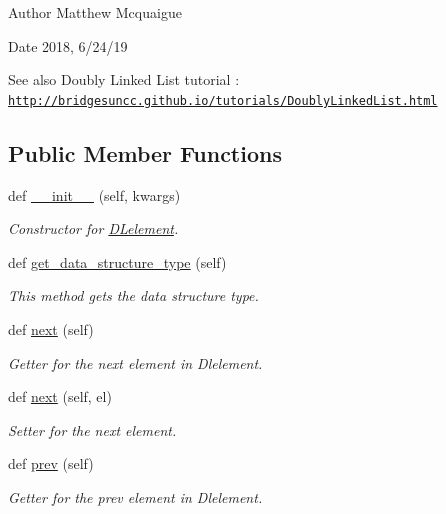 \begin{DoxyAuthor}{Author}
Matthew Mcquaigue 
\end{DoxyAuthor}
\begin{DoxyDate}{Date}
2018, 6/24/19
\end{DoxyDate}
\begin{DoxySeeAlso}{See also}
Doubly Linked List tutorial \+: \href{http://bridgesuncc.github.io/tutorials/DoublyLinkedList.html}{\tt http\+://bridgesuncc.\+github.\+io/tutorials/\+Doubly\+Linked\+List.\+html} 
\end{DoxySeeAlso}
\subsection*{Public Member Functions}
\begin{DoxyCompactItemize}
\item 
def \hyperlink{classbridges_1_1dl__element_1_1_d_lelement_a1ade3543dee3c48d6030125b37f993bb}{\+\_\+\+\_\+init\+\_\+\+\_\+} (self, kwargs)
\begin{DoxyCompactList}\small\item\em Constructor for \hyperlink{classbridges_1_1dl__element_1_1_d_lelement}{D\+Lelement}. \end{DoxyCompactList}\item 
def \hyperlink{classbridges_1_1dl__element_1_1_d_lelement_a5fb177ed67b75e606ac303f7a972d301}{get\+\_\+data\+\_\+structure\+\_\+type} (self)
\begin{DoxyCompactList}\small\item\em This method gets the data structure type. \end{DoxyCompactList}\item 
def \hyperlink{classbridges_1_1dl__element_1_1_d_lelement_a43077e810ec453c9cd512ba75819e28a}{next} (self)
\begin{DoxyCompactList}\small\item\em Getter for the next element in Dlelement. \end{DoxyCompactList}\item 
def \hyperlink{classbridges_1_1dl__element_1_1_d_lelement_ae46f630cd7384689d4305770e6b2c7c1}{next} (self, el)
\begin{DoxyCompactList}\small\item\em Setter for the next element. \end{DoxyCompactList}\item 
def \hyperlink{classbridges_1_1dl__element_1_1_d_lelement_a66e7c4bfb2216a68744fe58c24e9917f}{prev} (self)
\begin{DoxyCompactList}\small\item\em Getter for the prev element in Dlelement. \end{DoxyCompactList}\item 

\end{DoxyCompactItemize}
